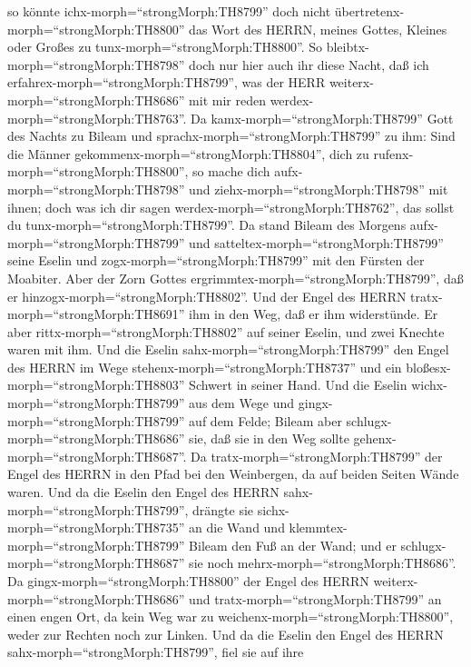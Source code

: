 so könnte ichx-morph=``strongMorph:TH8799'' doch nicht
übertretenx-morph=``strongMorph:TH8800'' das Wort des HERRN, meines
Gottes, Kleines oder Großes zu tunx-morph=``strongMorph:TH8800''.
 So bleibtx-morph=``strongMorph:TH8798'' doch nur hier auch
ihr diese Nacht, daß ich erfahrex-morph=``strongMorph:TH8799'', was der
HERR weiterx-morph=``strongMorph:TH8686'' mit mir reden
werdex-morph=``strongMorph:TH8763''.  Da
kamx-morph=``strongMorph:TH8799'' Gott des Nachts zu Bileam und
sprachx-morph=``strongMorph:TH8799'' zu ihm: Sind die Männer
gekommenx-morph=``strongMorph:TH8804'', dich zu
rufenx-morph=``strongMorph:TH8800'', so mache dich
aufx-morph=``strongMorph:TH8798'' und ziehx-morph=``strongMorph:TH8798''
mit ihnen; doch was ich dir sagen werdex-morph=``strongMorph:TH8762'',
das sollst du tunx-morph=``strongMorph:TH8799''.  Da stand
Bileam des Morgens aufx-morph=``strongMorph:TH8799'' und
satteltex-morph=``strongMorph:TH8799'' seine Eselin und
zogx-morph=``strongMorph:TH8799'' mit den Fürsten der Moabiter.
 Aber der Zorn Gottes
ergrimmtex-morph=``strongMorph:TH8799'', daß er
hinzogx-morph=``strongMorph:TH8802''. Und der Engel des HERRN
tratx-morph=``strongMorph:TH8691'' ihm in den Weg, daß er ihm
widerstünde. Er aber rittx-morph=``strongMorph:TH8802'' auf seiner
Eselin, und zwei Knechte waren mit ihm.  Und die Eselin
sahx-morph=``strongMorph:TH8799'' den Engel des HERRN im Wege
stehenx-morph=``strongMorph:TH8737'' und ein
bloßesx-morph=``strongMorph:TH8803'' Schwert in seiner Hand. Und die
Eselin wichx-morph=``strongMorph:TH8799'' aus dem Wege und
gingx-morph=``strongMorph:TH8799'' auf dem Felde; Bileam aber
schlugx-morph=``strongMorph:TH8686'' sie, daß sie in den Weg sollte
gehenx-morph=``strongMorph:TH8687''.  Da
tratx-morph=``strongMorph:TH8799'' der Engel des HERRN in den Pfad bei
den Weinbergen, da auf beiden Seiten Wände waren.  Und da
die Eselin den Engel des HERRN sahx-morph=``strongMorph:TH8799'',
drängte sie sichx-morph=``strongMorph:TH8735'' an die Wand und
klemmtex-morph=``strongMorph:TH8799'' Bileam den Fuß an der Wand; und er
schlugx-morph=``strongMorph:TH8687'' sie noch
mehrx-morph=``strongMorph:TH8686''.  Da
gingx-morph=``strongMorph:TH8800'' der Engel des HERRN
weiterx-morph=``strongMorph:TH8686'' und
tratx-morph=``strongMorph:TH8799'' an einen engen Ort, da kein Weg war
zu weichenx-morph=``strongMorph:TH8800'', weder zur Rechten noch zur
Linken.  Und da die Eselin den Engel des HERRN
sahx-morph=``strongMorph:TH8799'', fiel sie auf ihre
